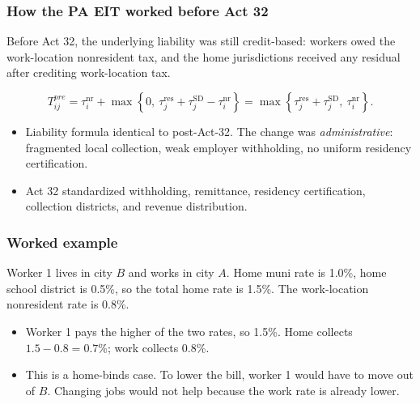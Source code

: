 \documentclass[xcolor = x11names, compress, aspectratio = 169]{beamer}
\renewcommand{\(}{\begin{columns}}
\renewcommand{\)}{\end{columns}}
\newcommand{\<}[1]{\begin{column}{#1}}
\renewcommand{\>}{\end{column}}
\begin{document}
\begin{frame}
\frametitle{How the PA EIT worked before Act 32}
    \footnotesize
    Before Act 32, the underlying liability was still credit-based:
    workers owed the work-location nonresident tax, and the home
    jurisdictions received any residual after crediting work-location tax.

    \[
        T_{ij}^{pre}
        = \tau^{\text{nr}}_i + \max\!\left\{0,\ \tau^{\text{res}}_j + \tau^{\text{SD}}_j - \tau^{\text{nr}}_i\right\}
        = \max\!\left\{\tau^{\text{res}}_j + \tau^{\text{SD}}_j,\ \tau^{\text{nr}}_i\right\}.
    \]

    \begin{itemize}\setlength{\itemsep}{0.05cm}
        \item Liability formula identical to post-Act-32. The change was
        \emph{administrative}: fragmented local collection, weak employer
        withholding, no uniform residency certification.
        \item Act 32 standardized withholding, remittance, residency
        certification, collection districts, and revenue distribution.
    \end{itemize}
\end{frame}

\begin{frame}
\frametitle{Worked example}
    \small
    Worker 1 lives in city $B$ and works in city $A$.
    Home muni rate is 1.0\%, home school district is 0.5\%, so the total
    home rate is 1.5\%. The work-location nonresident rate is 0.8\%.
    \begin{itemize}\setlength{\itemsep}{0.1cm}
        \item Worker 1 pays the higher of the two rates, so 1.5\%.
        Home collects $1.5 - 0.8 = 0.7$\%; work collects 0.8\%.
        \item This is a home-binds case. To lower the bill,
        worker 1 would have to move out of $B$. Changing jobs would
        not help because the work rate is already lower.
    \end{itemize}
\end{frame}
\end{document}
